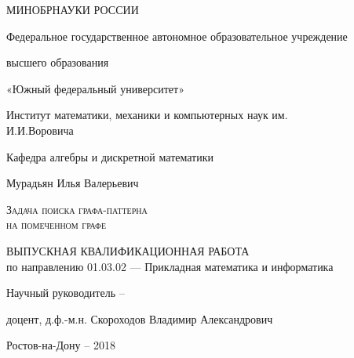 \begin{center}
{ \bfseries

\large{МИНОБРНАУКИ РОССИИ}

\vspace{1cm}

\large{Федеральное государственное автономное образовательное 
	учреждение}

\large{высшего образования}

\large{«Южный федеральный университет»}

\vspace{1cm}

\large{Институт математики, механики и компьютерных наук им.\\ И.И.Воровича}
 
\large{Кафедра алгебры и дискретной математики}

\vspace{2cm}

\large{Мурадьян Илья Валерьевич}

\vspace{2cm}

\LARGE{\textsc{Задача поиска графа-паттерна\\ на помеченном графе}}

\vspace{2cm}

\large{ВЫПУСКНАЯ КВАЛИФИКАЦИОННАЯ РАБОТА\\
}
\large{по направлению 01.03.02 — Прикладная математика и информатика}
\vspace{2cm}

 
\large{ 
Научный руководитель -- 

доцент,  д.ф.-м.н. Скороходов Владимир Александрович
}

\vspace{6cm}

Ростов-на-Дону -- 2018
}
\end{center}
\thispagestyle{empty}
\pagebreak